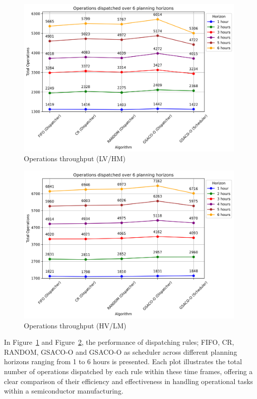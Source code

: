 \begin{figure}[t]
	\centering
	\includegraphics[width=\textwidth]{LVHM/operations_LVHM.png}
	\caption{Operations throughput (LV/HM)}
	\label{fig:totalopsLVHM}
\end{figure}

\begin{figure}[t]
	\includegraphics[width=\textwidth]{HVLM/operations_HVLM.png}
	\caption{Operations throughput (HV/LM)}
	\label{fig:totalopsHVLM}
\end{figure}

In Figure~\ref{fig:totalopsLVHM} and Figure~\ref{fig:totalopsHVLM}, the performance of dispatching rules; FIFO, CR, RANDOM, GSACO-O and GSACO-O as scheduler across different planning horizons ranging from 1 to 6 hours is presented. Each plot illustrates the total number of operations dispatched by each rule within these time frames, offering a clear comparison of their efficiency and effectiveness in handling operational tasks within a semiconductor manufacturing.


